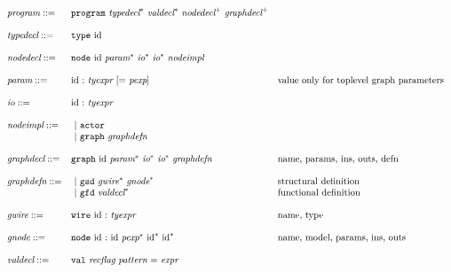 \clearpage
$  \begin{array}{lll}
    \emph{program} ::= & \mathtt{program}~\emph{typedecl}^*~\emph{valdecl}^*~\emph{nodedecl}^+~\emph{graphdecl}^+ & \\
    \\
    \emph{typedecl}  ::= & \mathtt{type}~\text{id} & \\
     \\
    \emph{nodedecl}  ::= & \mathtt{node}~\text{id}~\emph{param}^*~\emph{io}^*~\emph{io}^*~\emph{nodeimpl} &\\
    \\
    \emph{param} ::= &  \text{id}~\mathtt{:}~\emph{tyexpr}~[\mathtt{=}~\emph{pexp}] & \text{value only for
                                                                        toplevel graph parameters}\\
    \\
    \emph{io} ::= &  \text{id}~\mathtt{:}~\emph{tyexpr} & \\
    \\
    \emph{nodeimpl}  ::= &  ~|\ \mathtt{actor} & \\
                       &  ~|\ \mathtt{graph}~\emph{graphdefn} & \\
    \\
    \emph{graphdecl}  ::= & \mathtt{graph}~\text{id}~\emph{param}^*~\emph{io}^*~\emph{io}^*~\emph{graphdefn} &
                                                                                                \text{name,
                                                                                                params,
     ins, outs, defn}\\
    \\
    \emph{graphdefn}  ::= & ~|\ \mathtt{gsd}~\emph{gwire}^*~\emph{gnode}^* & \text{structural definition} \\
                        & ~|\ \mathtt{gfd}~\emph{valdecl}^* & \text{functional definition}  \\
    \\
    \emph{gwire}  ::= & \mathtt{wire}~\text{id}~\mathtt{:}~\emph{tyexpr} & \text{name, type}\\
    \\
    \emph{gnode}  ::= & \mathtt{node}~\text{id}~\mathtt{:}~\text{id}~\emph{pexp}^*~\text{id}^*~\text{id}^* & \text{name, model, params, ins, outs} \\
    \\
    \emph{valdecl}    ::= & \mathtt{val}~\emph{recflag}~\emph{pattern}~\mathtt{=}~\emph{expr} & \\
    \\
\end{array}$

